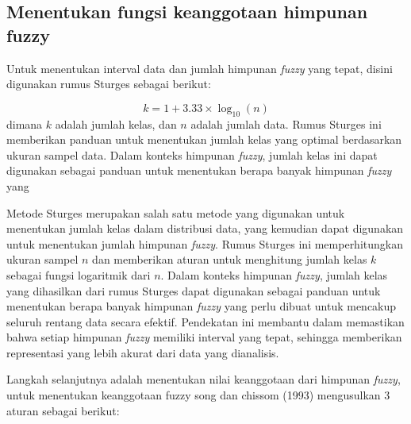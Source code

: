 \documentclass[conference]{IEEEtran}
\begin{document}
\subsection{Menentukan fungsi  keanggotaan himpunan fuzzy} \label{AA}
Untuk menentukan interval data dan jumlah himpunan \textit{fuzzy} yang tepat, disini digunakan rumus Sturges sebagai berikut:

\begin{equation}
    k = 1 + 3.33 \times \log_{10}(n)
\end{equation}
dimana $k$ adalah jumlah kelas, dan $n$ adalah jumlah data. Rumus Sturges ini memberikan panduan untuk menentukan jumlah kelas yang optimal berdasarkan ukuran sampel data. Dalam konteks himpunan \textit{fuzzy}, jumlah kelas ini dapat digunakan sebagai panduan untuk menentukan berapa banyak himpunan \textit{fuzzy} yang

Metode Sturges merupakan salah satu metode yang digunakan untuk menentukan jumlah kelas dalam distribusi data, yang kemudian dapat digunakan untuk menentukan jumlah himpunan \textit{fuzzy}. Rumus Sturges ini memperhitungkan ukuran sampel \( n \) dan memberikan aturan untuk menghitung jumlah kelas \( k \) sebagai fungsi logaritmik dari \( n \). Dalam konteks himpunan \textit{fuzzy}, jumlah kelas yang dihasilkan dari rumus Sturges dapat digunakan sebagai panduan untuk menentukan berapa banyak himpunan \textit{fuzzy} yang perlu dibuat untuk mencakup seluruh rentang data secara efektif. Pendekatan ini membantu dalam memastikan bahwa setiap himpunan \textit{fuzzy} memiliki interval yang tepat, sehingga memberikan representasi yang lebih akurat dari data yang dianalisis.



Langkah selanjutnya adalah menentukan nilai keanggotaan dari himpunan \textit{fuzzy}, untuk menentukan keanggotaan fuzzy song dan chissom (1993) mengusulkan 3 aturan sebagai berikut:
\end{document}

